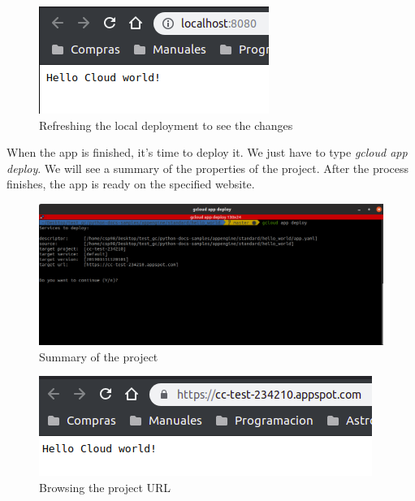 \documentclass[12pt,english]{article}
\begin{document}
\begin{figure}[H]
  \centering
  \includegraphics[scale = 1]{../img/tutorial/7browsemodify}
  \caption{Refreshing the local deployment to see the changes}
\end{figure}

When the app is finished, it's time to deploy it. We just have to type \emph{gcloud app deploy}. We will see a summary of the properties of the project. After the process finishes, the app is ready on the specified website.

\begin{figure}[H]
  \centering
  \includegraphics[scale = 0.5]{../img/tutorial/8deploy}
  \caption{Summary of the project}
\end{figure}

\begin{figure}[H]
  \centering
  \includegraphics[scale = 1]{../img/tutorial/9browse}
  \caption{Browsing the project URL}
\end{figure}

\newpage
\end{document}
